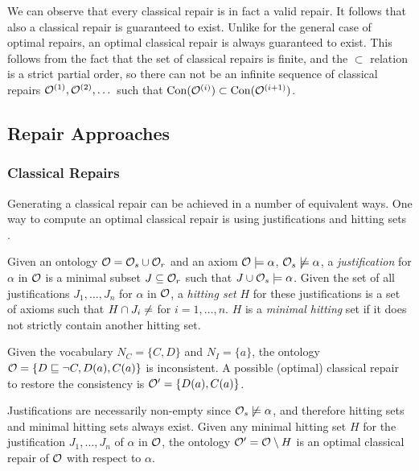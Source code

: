 We can observe that every classical repair is in fact a valid repair. It follows that also a classical repair is guaranteed to exist. Unlike for the general case of optimal repairs, an optimal classical repair is always guaranteed to exist. This follows from the fact that the set of classical repairs is finite, and the $\subset$ relation is a strict partial order, so there can not be an infinite sequence of classical repairs $\mathcal{O}^{(1)}, \mathcal{O}^{(2)}, \dots$  such that $\operatorname{Con}(\mathcal{O}^{(i)}) \subset \operatorname{Con}(\mathcal{O}^{(i + 1)})$.

\subsection{Repair Approaches} \label{repair-approaches}

\subsubsection{Classical Repairs} \label{classical-repairs}

Generating a classical repair can be achieved in a number of equivalent ways. One way to compute an optimal classical repair is using justifications and hitting sets \cite{reiter1987theory}.

\begin{definition}
  Given an ontology $\mathcal{O} = \mathcal{O}_s \cup \mathcal{O}_r$ and an axiom $\mathcal{O} \models \alpha$, $\mathcal{O}_s \not\models \alpha$, a \emph{justification} for $\alpha$ in $\mathcal{O}$ is a minimal subset $J \subseteq \mathcal{O}_r$ such that $J \cup \mathcal{O}_s \models \alpha$. Given the set of all justifications $J_1, \dots, J_n$ for $\alpha$ in $\mathcal{O}$, a \emph{hitting set} $H$ for these justifications is a set of axioms such that $H \cap J_i \not= \empty$ for $i = 1, \dots, n$. $H$ is a \emph{minimal hitting} set if it does not strictly contain another hitting set.
\end{definition}

\begin{example}
  Given the vocabulary $N_C = \{ C, D \}$ and $N_I = \{ a \}$, the ontology $\mathcal{O} = \{ D \sqsubseteq \lnot C, D(a), C(a) \}$ is inconsistent. A possible (optimal) classical repair to restore the consistency is $\mathcal{O}' = \{ D(a), C(a) \}$.
\end{example}

Justifications are necessarily non-empty since $\mathcal{O}_s \not\models \alpha$, and therefore hitting sets and minimal hitting sets always exist. Given any minimal hitting set $H$ for the justification $J_1, \dots, J_n$ of $\alpha$ in $\mathcal{O}$, the ontology $\mathcal{O}' = \mathcal{O} \setminus H$ is an optimal classical repair of $\mathcal{O}$ with respect to $\alpha$.

